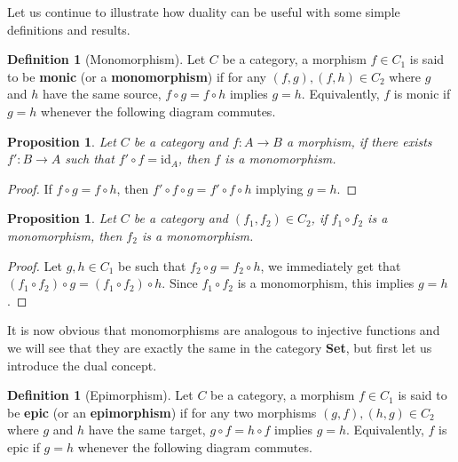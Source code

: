 \documentclass{article}
\newtheorem{prop}[thm]{Proposition}
\theoremstyle{definition}
\newtheorem{defn}[thm]{Definition}
\theoremstyle{remark}
\newcommand{\id}{\text{id}}
\begin{document}
Let us continue to illustrate how duality can be useful with some simple definitions and results.
\begin{defn}[Monomorphism]
	Let $C$ be a category, a morphism $f \in C_1$ is said to be \textbf{monic} (or a \textbf{monomorphism}) if for any $(f,g), (f,h) \in C_2$ where $g$ and $h$ have the same source, $f\circ g = f\circ h$ implies $g = h$. Equivalently, $f$ is monic if $g = h$ whenever the following diagram commutes.
	\begin{figure}[h]
		\centering
	\end{figure}
\end{defn}
\begin{prop}\label{propmon1}
	Let $C$ be a category and $f:A\rightarrow B$ a morphism, if there exists $f': B\rightarrow A$ such that $f'\circ f = \id_A$, then $f$ is a monomorphism.
\end{prop}
\begin{proof}
	If $f\circ g = f\circ h$, then $f'\circ f \circ g = f'\circ f \circ h$ implying $g = h$.
\end{proof}
\begin{prop}\label{propmon2}
	Let $C$ be a category and $(f_1, f_2) \in C_2$, if $f_1 \circ f_2$ is a monomorphism, then $f_2$ is a monomorphism.
\end{prop}
\begin{proof}
	Let $g,h \in C_1$ be such that $f_2\circ g = f_2\circ h$, we immediately get that $(f_1\circ f_2)\circ g = (f_1 \circ f_2) \circ h$. Since $f_1\circ f_2$ is a monomorphism, this implies $g = h$.
\end{proof}
It is now obvious that monomorphisms are analogous to injective functions and we will see that they are exactly the same in the category \textbf{Set}, but first let us introduce the dual concept.
\begin{defn}[Epimorphism]
	Let $C$ be a category, a morphism $f \in C_1$ is said to be \textbf{epic} (or an \textbf{epimorphism}) if for any two morphisms $(g,f), (h,g) \in C_2$ where $g$ and $h$ have the same target, $g\circ f = h\circ f$ implies $g = h$. Equivalently, $f$ is epic if $g = h$ whenever the following diagram commutes.
	\begin{figure}[h]
		\centering
	\end{figure}
\end{defn}
\end{document}

